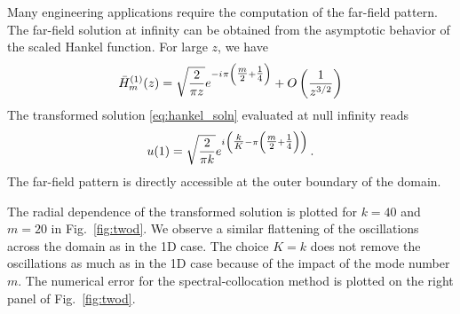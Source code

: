 \documentclass[final,onefignum,onetabnum]{siamart190516}
\newcommand{\iu}{{i\mkern1mu}}
\begin{document}
Many engineering applications require the computation of the far-field pattern. The far-field solution at infinity can be obtained from the asymptotic behavior of the scaled Hankel function. For large $z$, we have \cite{olver1972bessel}
\[ \bar{H}_{m}^{(1)}(z) = \sqrt{\frac{2}{\pi z}} e^{-\iu \pi \left(\tfrac{m}{2}+\tfrac{1}{4} \right)} + O\left(\frac{1}{z^{3/2}}\right) \]
The transformed solution \eqref{eq:hankel_soln} evaluated at null infinity reads
\[ u(1) = \sqrt{\frac{2}{\pi k}} e^{\iu \left(\tfrac{k}{K}- \pi \left(\tfrac{m}{2}+\tfrac{1}{4} \right) \right)}\,. \]
The far-field pattern is directly accessible at the outer boundary of the domain.

The radial dependence of the transformed solution is plotted for $k=40$ and $m=20$ in Fig.~\ref{fig:twod}. We observe a similar flattening of the oscillations across the domain as in the 1D case. The choice $K=k$ does not remove the oscillations as much as in the 1D case because of the impact of the mode number $m$. The numerical error for the spectral-collocation method is plotted on the right panel of Fig.~\ref{fig:twod}. 
\end{document}
